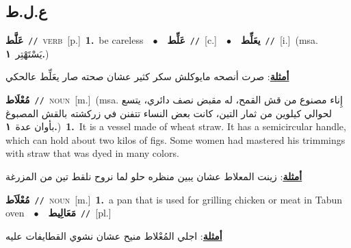 \documentclass[10pt,a4paper,twoside]{article} %
\begin{document}
\begin{multicols}{2}
\vspace{-3mm}
\subsection*{\color{blue}\foreignlanguage{arabic}{ع.ل.ط}\color{blue}{}} 

{\setlength\topsep{0pt}\textbf{\foreignlanguage{arabic}{عَلَّط}}\ {\color{gray}\texttt{//}\color{black}}\ \textsc{verb}\ [p.]\ \textbf{1.}~be careless\ \ $\bullet$\ \ \setlength\topsep{0pt}\textbf{\foreignlanguage{arabic}{عَلِّط}}\ {\color{gray}\texttt{//}\color{black}}\ [c.]\ \ $\bullet$\ \ \setlength\topsep{0pt}\textbf{\foreignlanguage{arabic}{يعَلِّط}}\ {\color{gray}\texttt{//}\color{black}}\ [i.]\ \color{gray}(msa. \foreignlanguage{arabic}{يَسْتَهْتِر}~\foreignlanguage{arabic}{\textbf{١.}})\color{black}\  \begin{flushright}\color{gray}\foreignlanguage{arabic}{\textbf{\underline{\foreignlanguage{arabic}{أمثلة}}}: صرت أنصحه مايوكلش سكر كثير عشان صحته صار يعَلِّط عالحكي}\end{flushright}\color{black}} \vspace{2mm}

{\setlength\topsep{0pt}\textbf{\foreignlanguage{arabic}{مُعْلَاط}}\ {\color{gray}\texttt{//}\color{black}}\ \textsc{noun}\ [m.]\ \color{gray}(msa. \foreignlanguage{arabic}{إِناء مصنوع من قش القمح، له مقبض نصف دائري، يتسع لحوالي كيلوين من ثمار التين، كانت بعض النساء تتفنن في زركشته بالقش المصبوغ بأوان عدة}~\foreignlanguage{arabic}{\textbf{١.}})\color{black}\ \textbf{1.}~It is a vessel made of wheat straw. It has a semicircular handle, which can hold about two kilos of figs. Some women had mastered his trimmings with straw that was dyed in many colors.\  \begin{flushright}\color{gray}\foreignlanguage{arabic}{\textbf{\underline{\foreignlanguage{arabic}{أمثلة}}}: زينت المعلاط عشان يبين منظره حلو لما نروح نلقط تين من المزرغة}\end{flushright}\color{black}} \vspace{2mm}

{\setlength\topsep{0pt}\textbf{\foreignlanguage{arabic}{مُعْلَاَط}}\ {\color{gray}\texttt{//}\color{black}}\ \textsc{noun}\ [m.]\ \textbf{1.}~a pan that is used for grilling chicken or meat in Tabun oven\ \ $\bullet$\ \ \setlength\topsep{0pt}\textbf{\foreignlanguage{arabic}{مَعَالِيط}}\ {\color{gray}\texttt{//}\color{black}}\ [pl.]\  \begin{flushright}\color{gray}\foreignlanguage{arabic}{\textbf{\underline{\foreignlanguage{arabic}{أمثلة}}}: اجلي المُعْلاط منيح عشان نشوي القطايفات عليه}\end{flushright}\color{black}} \vspace{2mm}


\end{multicols}
\end{document}

